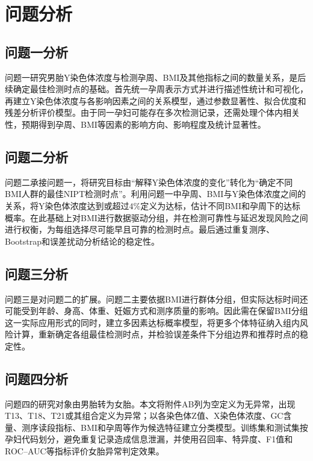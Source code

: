 \section{问题分析}

\subsection{问题一分析}

问题一研究男胎Y染色体浓度与检测孕周、BMI及其他指标之间的数量关系，是后续确定最佳检测时点的基础。首先统一孕周表示方式并进行描述性统计和可视化，再建立Y染色体浓度与各影响因素之间的关系模型，通过参数显著性、拟合优度和残差分析评价模型。由于同一孕妇可能存在多次检测记录，还需处理个体内相关性，预期得到孕周、BMI等因素的影响方向、影响程度及统计显著性。

\subsection{问题二分析}

问题二承接问题一，将研究目标由“解释Y染色体浓度的变化”转化为“确定不同BMI人群的最佳NIPT检测时点”。利用问题一中孕周、BMI与Y染色体浓度之间的关系，将Y染色体浓度达到或超过$4\%$定义为达标，估计不同BMI和孕周下的达标概率。在此基础上对BMI进行数据驱动分组，并在检测可靠性与延迟发现风险之间进行权衡，为每组选择尽可能早且可靠的检测时点。最后通过重复测序、Bootstrap和误差扰动分析结论的稳定性。

\subsection{问题三分析}

问题三是对问题二的扩展。问题二主要依据BMI进行群体分组，但实际达标时间还可能受到年龄、身高、体重、妊娠方式和测序质量的影响。因此需在保留BMI分组这一实际应用形式的同时，建立多因素达标概率模型，将更多个体特征纳入组内风险计算，重新确定各组最佳检测时点，并检验误差条件下分组边界和推荐时点的稳定性。

\subsection{问题四分析}

问题四的研究对象由男胎转为女胎。本文将附件AB列为空定义为无异常，出现T13、T18、T21或其组合定义为异常；以各染色体Z值、X染色体浓度、GC含量、测序读段指标、BMI和孕周等作为候选特征建立分类模型。训练集和测试集按孕妇代码划分，避免重复记录造成信息泄漏，并使用召回率、特异度、F1值和ROC--AUC等指标评价女胎异常判定效果。
